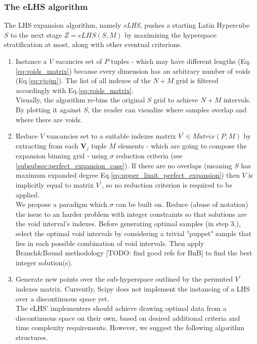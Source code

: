 \documentclass[12pt]{extarticle}
\newcommand{\meqref}[1]{Eq.\ref{#1}}
\begin{document}
\subsubsection{The eLHS algorithm}
\label{subsubsec:algorithm}
The LHS expansion algorithm, namely \textit{eLHS}, pushes a starting Latin Hypercube $S$ to the next stage $Z = eLHS(S, M)$ by maximizing the hyperspace stratification at most, along with other eventual criterions.

\begin{enumerate}
\item Instance a $V$ vacancies set of $P$ tuples - which may have different lengths (\meqref{eq:voids_matrix}) because every dimension has an arbitrary number of voids (\meqref{eq:vjojm}). The list of all indexes of the $N+M$ grid is filtered accordingly with \meqref{eq:voids_matrix}. \\ 
Visually, the algorithm re-bins the original $S$ grid to achieve $N+M$ intervals. By plotting it against $S$, the reader can visualize where samples overlap and where there are voids.

\item Reduce $V$ vancancies set to a suitable indexes matrix $V^\prime \in Matrix(P, M)$ by extracting from each $\textbf{V}_j$ tuple $M$ elements - which are going to compose the expansion binning grid - using $\sigma$ reduction criteria (see \cref{subsubsec:perfect_expansion_case}). If there are no overlaps (meaning $S$ has maximum expanded degree \meqref{eq:upper_limit_perfect_expansion}) then $V$ is implicitly equal to matrix $V^\prime$, so no reduction criterion is required to be applied. \\
We propose a paradigm which $\sigma$ can be built on. Reduce (abuse of notation) the issue to an harder problem with integer constraints so that solutions are the void interval's indexes. Before generating optimal samples (in step 3.), select the optimal void intervals by considering a trivial "puppet" sample that lies in each possible combination of void intervals. Then apply Branch{\&}Bound methodology [TODO: find good refs for BnB] to find the best integer solution(s).

\item Generate new points over the sub-hyperspace outlined by the permuted $V^\prime$ indexes matrix. Currently, Scipy does not implement the instancing of a LHS over a discontinuous space yet.\\
The eLHS' implementers should achieve drawing optimal data from a discontinuous space on their own, based on desired additional criteria and time complexity requirements. However, we suggest the following algorithm structures.
	

\end{enumerate}
\end{document}
